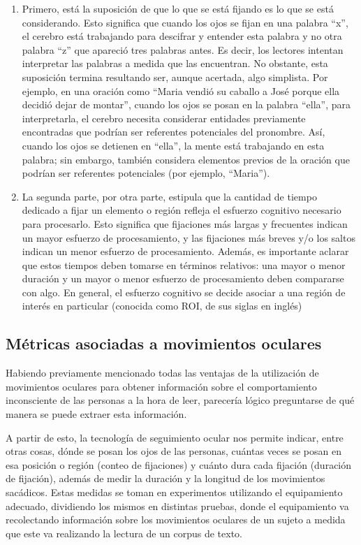 \begin{enumerate}
    \item Primero, está la suposición de que lo que se está fijando es lo que se está considerando. Esto significa que cuando los ojos se fijan en una palabra “x”, el cerebro está trabajando para descifrar y entender esta palabra y no otra palabra “z” que apareció tres palabras antes. Es decir, los lectores intentan interpretar las palabras a medida que las encuentran. No obstante, esta suposición termina resultando ser, aunque acertada, algo simplista. \parencite{EhrlichRayner1983} Por ejemplo, en una oración como “Maria vendió su caballo a José porque ella decidió dejar de montar”, cuando los ojos se posan en la palabra “ella”, para interpretarla, el cerebro necesita considerar entidades previamente encontradas que podrían ser referentes potenciales del pronombre. Así, cuando los ojos se detienen en “ella”, la mente está trabajando en esta palabra; sin embargo, también considera elementos previos de la oración que podrían ser referentes potenciales (por ejemplo, “Maria”).
    \item La segunda parte, por otra parte, estipula que la cantidad de tiempo dedicado a fijar un elemento o región refleja el esfuerzo cognitivo necesario para procesarlo. Esto significa que fijaciones más largas y frecuentes indican un mayor esfuerzo de procesamiento, y las fijaciones más breves y/o los saltos indican un menor esfuerzo de procesamiento. Además, es importante aclarar que estos tiempos deben tomarse en términos relativos: una mayor o menor duración y un mayor o menor esfuerzo de procesamiento deben compararse con algo. En general, el esfuerzo cognitivo se decide asociar a una región de interés en particular (conocida como ROI, de sus siglas en inglés)
\end{enumerate}

\subsection{Métricas asociadas a movimientos oculares}

\label{subsec:metricas_movimientos}

Habiendo previamente mencionado todas las ventajas de la utilización de movimientos oculares para obtener información sobre el comportamiento inconsciente de las personas a la hora de leer, parecería lógico preguntarse de qué manera se puede extraer esta información.

A partir de esto, la tecnología de seguimiento ocular nos permite indicar, entre otras cosas, dónde se posan los ojos de las personas, cuántas veces se posan en esa posición o región (conteo de fijaciones) y cuánto dura cada fijación (duración de fijación), además de medir la duración y la longitud de los movimientos sacádicos. Estas medidas se toman en experimentos utilizando el equipamiento adecuado, dividiendo los mismos en distintas pruebas, donde el equipamiento va recolectando información sobre los movimientos oculares de un sujeto a medida que este va realizando la lectura de un corpus de texto.

